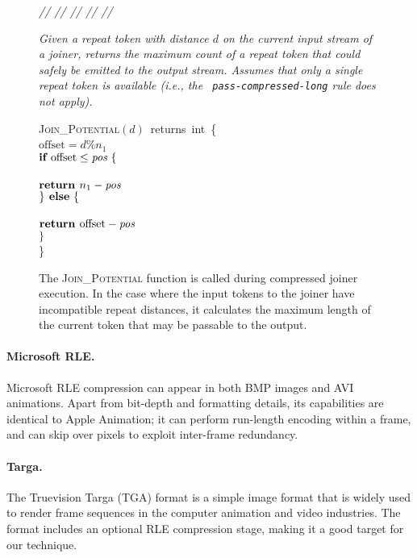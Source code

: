 \begin{figure}[t]
\begin{minipage}{0.1in}
\vspace{-1.75pt}
{\it // // // // //}
\end{minipage}
\begin{minipage}{3.23in}
{\it Given a repeat token with distance $d$ on the current input
  stream of a joiner, returns the maximum count of a repeat token that
  could safely be emitted to the output stream.  Assumes that only a
  single repeat token is available (i.e., the {\tt
    pass-compressed-long} rule does not apply).}
\end{minipage}
\textsc{Join\_Potential}$(d)$~returns~int~\{\\
\tab$\mbox{offset} = d$\%$n_1$\\
\tab$\mbox{{\bf if~}} \mbox{offset} \leq \mbox{\it pos} ~\{$\\
\tab{}\\
\tab\tab$\mbox{\bf return~} n_1 - \mbox{\it pos}$\\
\tab$\} \mbox{\bf ~else} ~\{$\\
\tab{}\\
\tab\tab$\mbox{\bf return~} \mbox{offset} - \mbox{\it pos}$\\
\tab$\}$\\
\}
\caption{The \textsc{Join\_Potential} function is called during
  compressed joiner execution.  In the case where the input tokens to
  the joiner have incompatible repeat distances, it calculates the
  maximum length of the current token that may be passable to the
  output. \protect\label{fig:join-potential}}
\end{figure}

\paragraph{Microsoft RLE.}
Microsoft RLE compression can appear in both BMP images and AVI
animations.  Apart from bit-depth and formatting details, its
capabilities are identical to Apple Animation; it can perform
run-length encoding within a frame, and can skip over pixels to
exploit inter-frame redundancy.

\paragraph{Targa.}
The Truevision Targa (TGA) format is a simple image format that is
widely used to render frame sequences in the computer animation and
video industries.  The format includes an optional RLE compression
stage, making it a good target for our technique.

